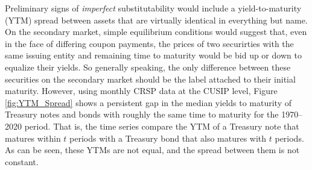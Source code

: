 \documentclass[11pt,a4paper,margin=1.5in]{article}
\begin{document}
Preliminary signs of {\em imperfect} substitutability would include a yield-to-maturity (YTM) spread between assets that are virtually identical in everything but name.
On the secondary market, simple equilibrium conditions would suggest that, even in the face of differing coupon payments, the prices of two securirties with the same issuing entity and remaining time to maturity would be bid up or down to equalize their yields.
So generally speaking, the only difference between these securities on the secondary market should be the label attached to their initial maturity.
However, using monthly CRSP data at the CUSIP level, Figure \ref{fig:YTM_Spread} shows a persistent gap in the median yields to maturity of Treasury notes and bonds with roughly the same time to maturity for the 1970--2020 period.
That is, the time series compare the YTM of a Treasury note that matures within $t$ periods with a Treasury bond that also matures with $t$ periods.
As can be seen, these YTMs are not equal, and the spread between them is not constant.

\end{document}
